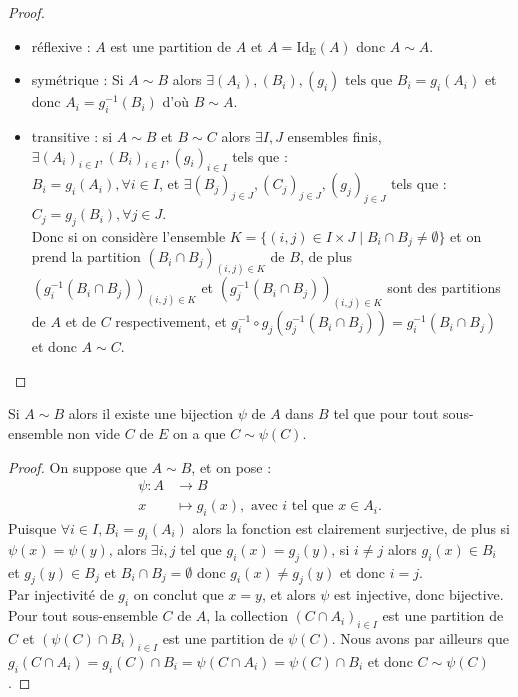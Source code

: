 \begin{proof}
  \hfill
  \begin{itemize}
    \item réflexive : $A$ est une partition de $A$ et $A=\mathrm{Id_E}(A)$ donc $A\sim A$.
    \item symétrique : Si $A \sim B$ alors $\exists (A_i), (B_i), (g_i) \text{ tels que } B_i=g_i(A_i)$ et donc $A_i=g_i^{-1}(B_i)$ d'où  $B \sim A$.
    \item transitive : si $A \sim B$ et $B \sim C$ alors $\exists I, J$ ensembles finis, $\exists (A_i)_{i \in I}, (B_i)_{i \in I}, (g_i)_{i \in I}$  tels que :\\ $B_i=g_i(A_i), \forall i \in I$, et $\exists (B_j)_{j \in J}, (C_j)_{j \in J}, (g_j)_{j \in J}$  tels que : $C_j=g_j(B_i), \forall j \in J$.\\
    Donc si on considère l'ensemble $K=\{ (i,j) \in I \times J \mid B_i\cap B_j\neq \emptyset \}$ et on prend la partition $(B_i\cap B_j)_{(i,j)\in K}$ de $B$, de plus $(g_i^{-1}(B_i\cap B_j))_{(i,j)\in K}$ et $(g_j^{-1}(B_i\cap B_j))_{(i,j)\in K}$ sont des partitions de $A$ et de $C$ respectivement, et $g_i^{-1} \circ g_j(g_j^{-1}(B_i\cap B_j)) = g_i^{-1}(B_i\cap B_j)$ et donc $A \sim C$.
  \end{itemize}
\end{proof}

\begin{prop}\label{prop10}
  \hfill

  Si $A \sim B$ alors il existe une bijection $\psi$ de $A$ dans $B$ tel que pour tout sous-ensemble non vide $C$ de $E$ on a que $C \sim \psi(C)$.
\end{prop}

\begin{proof}
  \hfill

\noindent
  On suppose que $A \sim B$, et on pose :
  \begin{align*}
  \psi \colon A &\to B\\
  x &\mapsto g_i(x), \text{ avec $i$ tel que $x \in A_i$}.
  \end{align*}
  Puisque $\forall i \in I, B_i = g_i(A_i)$ alors la fonction est clairement surjective, de plus si $\psi(x)= \psi (y)$, alors $\exists i, j$ tel  que $g_i(x)=g_j(y)$, si $i\ne j$ alors $g_i(x) \in B_i$ et $g_j(y) \in B_j$ et $B_i \cap B_j = \emptyset$ donc $g_i(x)\neq g_j(y)$ et donc $i=j$.\\ Par injectivité de $g_i$ on conclut que $x=y$, et alors $\psi$ est injective, donc bijective.
  Pour tout sous-ensemble $C$ de $A$, la collection $(C\cap A_i)_{i \in I}$ est une partition de $C$ et $(\psi(C) \cap B_i)_{i \in I}$ est une partition de $\psi(C)$. Nous avons par ailleurs que $g_i(C\cap A_i)= g_i(C)\cap B_i= \psi(C\cap A_i)=\psi(C)\cap B_i$ et donc $C \sim \psi(C)$.
\end{proof}

